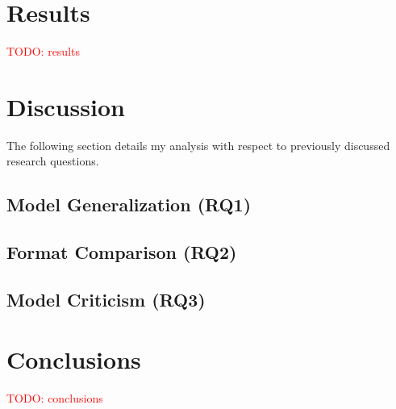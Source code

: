 \documentclass[review,sigconf]{acmart}
\newcommand{\todo}[1]{\textcolor{red}{TODO: #1}}
\begin{document}
\section{Results}
\todo{results}

\section{Discussion}

The following section details my analysis with respect to previously discussed research questions.

\subsection{Model Generalization (RQ1)}

\subsection{Format Comparison (RQ2)}

\subsection{Model Criticism (RQ3)}

\section{Conclusions}
\todo{conclusions}



\end{document}
